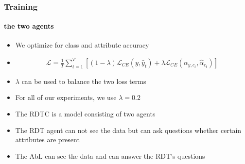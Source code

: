 \documentclass[9pt]{beamer}
\begin{document}
\begin{frame}
\frametitle{Training}
\framesubtitle{the two agents}
\begin{itemize}
	\item We optimize for class and attribute accuracy
	\item \begin{align*}
	\mathcal{L} = \frac{1}{T}\sum_{t=1}^{T}\left[(1-\lambda)\mathcal{L}_{CE}(y,\hat{y}_t) + \lambda \mathcal{L}_{CE}(\alpha_{y,c_t},\hat{\alpha}_{c_t}) \right]
	\end{align*}
	\item $\lambda$ can be used to balance the two loss terms
	\item For all of our experiments, we use $\lambda=0.2$
\end{itemize}
\end{frame}



\begin{frame}[plain]
\begin{itemize}
	\item The RDTC is a model consisting of two agents
	\item The RDT agent can not see the data but can ask questions whether certain attributes are present
	\item The AbL can see the data and can answer the RDT's questions
\end{itemize}
\end{frame}
\end{document}
